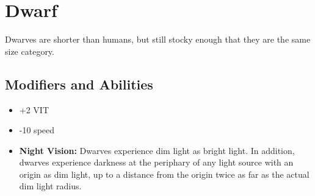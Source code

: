 \section{Dwarf}\label{dwarf}
Dwarves are shorter than humans, but still stocky enough that they are the same
size category.

\subsection*{Modifiers and Abilities}
\begin{itemize}
    \item +2 VIT
    \item -10 speed
    \item \textbf{Night Vision:} Dwarves experience dim light as bright light.
        In addition, dwarves experience darkness at the periphary of any
        light source with an origin as dim light, up to a distance from the
        origin twice as far as the actual dim light radius.
\end{itemize}
